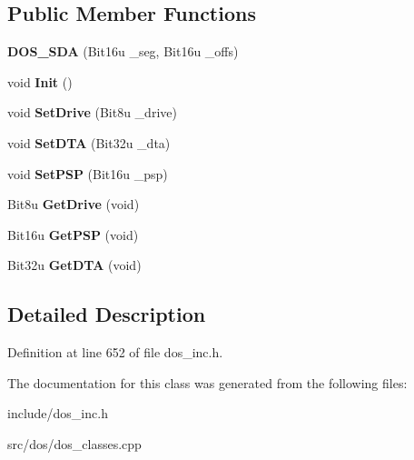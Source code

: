 \subsection*{Public Member Functions}
\begin{DoxyCompactItemize}
\item 
\hypertarget{classDOS__SDA_a6d3cdb7092bcf54e478ccf3f47ba5d5f}{{\bfseries D\-O\-S\-\_\-\-S\-D\-A} (Bit16u \-\_\-seg, Bit16u \-\_\-offs)}\label{classDOS__SDA_a6d3cdb7092bcf54e478ccf3f47ba5d5f}

\item 
\hypertarget{classDOS__SDA_ac7714f909bc845b995adc9d83a336dc7}{void {\bfseries Init} ()}\label{classDOS__SDA_ac7714f909bc845b995adc9d83a336dc7}

\item 
\hypertarget{classDOS__SDA_a26e7bcf4f9d9624cb400868ba2c92042}{void {\bfseries Set\-Drive} (Bit8u \-\_\-drive)}\label{classDOS__SDA_a26e7bcf4f9d9624cb400868ba2c92042}

\item 
\hypertarget{classDOS__SDA_a97cc9bf22c2fd0b3dfcdf9e7ed941b90}{void {\bfseries Set\-D\-T\-A} (Bit32u \-\_\-dta)}\label{classDOS__SDA_a97cc9bf22c2fd0b3dfcdf9e7ed941b90}

\item 
\hypertarget{classDOS__SDA_a01a00b99627b18c1b53112911554fb40}{void {\bfseries Set\-P\-S\-P} (Bit16u \-\_\-psp)}\label{classDOS__SDA_a01a00b99627b18c1b53112911554fb40}

\item 
\hypertarget{classDOS__SDA_a6191cfbb11aa6071c6900e3a42d3d4e8}{Bit8u {\bfseries Get\-Drive} (void)}\label{classDOS__SDA_a6191cfbb11aa6071c6900e3a42d3d4e8}

\item 
\hypertarget{classDOS__SDA_a7a777fd33ac1dcf09aeaa1e94e53eec5}{Bit16u {\bfseries Get\-P\-S\-P} (void)}\label{classDOS__SDA_a7a777fd33ac1dcf09aeaa1e94e53eec5}

\item 
\hypertarget{classDOS__SDA_a4a0b598523ac18da40e069ff37f43fe4}{Bit32u {\bfseries Get\-D\-T\-A} (void)}\label{classDOS__SDA_a4a0b598523ac18da40e069ff37f43fe4}

\end{DoxyCompactItemize}


\subsection{Detailed Description}


Definition at line 652 of file dos\-\_\-inc.\-h.



The documentation for this class was generated from the following files\-:\begin{DoxyCompactItemize}
\item 
include/dos\-\_\-inc.\-h\item 
src/dos/dos\-\_\-classes.\-cpp\end{DoxyCompactItemize}
